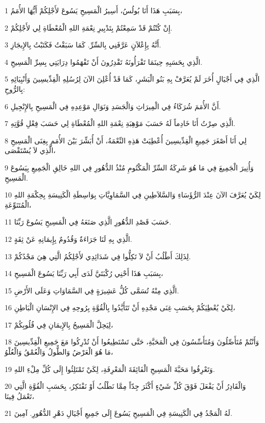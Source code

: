\par 1 بِسَبَبِ هَذَا أَنَا بُولُسُ، أَسِيرُ الْمَسِيحِ يَسُوعَ لأَجْلِكُمْ أَيُّهَا الأُمَمُ،
\par 2 إِنْ كُنْتُمْ قَدْ سَمِعْتُمْ بِتَدْبِيرِ نِعْمَةِ اللهِ الْمُعْطَاةِ لِي لأَجْلِكُمْ.
\par 3 أَنَّهُ بِإِعْلاَنٍ عَرَّفَنِي بِالسِّرِّ. كَمَا سَبَقْتُ فَكَتَبْتُ بِالإِيجَازِ.
\par 4 الَّذِي بِحَسَبِهِ حِينَمَا تَقْرَأُونَهُ تَقْدِرُونَ أَنْ تَفْهَمُوا دِرَايَتِي بِسِرِّ الْمَسِيحِ.
\par 5 الَّذِي فِي أَجْيَالٍ أُخَرَ لَمْ يُعَرَّفْ بِهِ بَنُو الْبَشَرِ، كَمَا قَدْ أُعْلِنَ الآنَ لِرُسُلِهِ الْقِدِّيسِينَ وَأَنْبِيَائِهِ بِالرُّوحِ:
\par 6 أَنَّ الأُمَمَ شُرَكَاءُ فِي الْمِيرَاثِ وَالْجَسَدِ وَنَوَالِ مَوْعِدِهِ فِي الْمَسِيحِ بِالإِنْجِيلِ.
\par 7 الَّذِي صِرْتُ أَنَا خَادِماً لَهُ حَسَبَ مَوْهِبَةِ نِعْمَةِ اللهِ الْمُعْطَاةِ لِي حَسَبَ فِعْلِ قُوَّتِهِ.
\par 8 لِي أَنَا أَصْغَرَ جَمِيعِ الْقِدِّيسِينَ أُعْطِيَتْ هَذِهِ النِّعْمَةُ، أَنْ أُبَشِّرَ بَيْنَ الأُمَمِ بِغِنَى الْمَسِيحِ الَّذِي لاَ يُسْتَقْصَى،
\par 9 وَأُنِيرَ الْجَمِيعَ فِي مَا هُوَ شَرِكَةُ السِّرِّ الْمَكْتُومِ مُنْذُ الدُّهُورِ فِي اللهِ خَالِقِ الْجَمِيعِ بِيَسُوعَ الْمَسِيحِ.
\par 10 لِكَيْ يُعَرَّفَ الآنَ عِنْدَ الرُّؤَسَاءِ وَالسَّلاَطِينِ فِي السَّمَاوِيَّاتِ بِوَاسِطَةِ الْكَنِيسَةِ بِحِكْمَةِ اللهِ الْمُتَنَوِّعَةِ،
\par 11 حَسَبَ قَصْدِ الدُّهُورِ الَّذِي صَنَعَهُ فِي الْمَسِيحِ يَسُوعَ رَبِّنَا.
\par 12 الَّذِي بِهِ لَنَا جَرَاءَةٌ وَقُدُومٌ بِإِيمَانِهِ عَنْ ثِقَةٍ.
\par 13 لِذَلِكَ أَطْلُبُ أَنْ لاَ تَكِلُّوا فِي شَدَائِدِي لأَجْلِكُمُ الَّتِي هِيَ مَجْدُكُمْ.
\par 14 بِسَبَبِ هَذَا أَحْنِي رُكْبَتَيَّ لَدَى أَبِي رَبِّنَا يَسُوعَ الْمَسِيحِ،
\par 15 الَّذِي مِنْهُ تُسَمَّى كُلُّ عَشِيرَةٍ فِي السَّمَاوَاتِ وَعَلَى الأَرْضِ.
\par 16 لِكَيْ يُعْطِيَكُمْ بِحَسَبِ غِنَى مَجْدِهِ أَنْ تَتَأَيَّدُوا بِالْقُوَّةِ بِرُوحِهِ فِي الإِنْسَانِ الْبَاطِنِ،
\par 17 لِيَحِلَّ الْمَسِيحُ بِالإِيمَانِ فِي قُلُوبِكُمْ،
\par 18 وَأَنْتُمْ مُتَأَصِّلُونَ وَمُتَأَسِّسُونَ فِي الْمَحَبَّةِ، حَتَّى تَسْتَطِيعُوا أَنْ تُدْرِكُوا مَعَ جَمِيعِ الْقِدِّيسِينَ مَا هُوَ الْعَرْضُ وَالطُّولُ وَالْعُمْقُ وَالْعُلْوُ،
\par 19 وَتَعْرِفُوا مَحَبَّةَ الْمَسِيحِ الْفَائِقَةَ الْمَعْرِفَةِ، لِكَيْ تَمْتَلِئُوا إِلَى كُلِّ مِلْءِ اللهِ.
\par 20 وَالْقَادِرُ أَنْ يَفْعَلَ فَوْقَ كُلِّ شَيْءٍ أَكْثَرَ جِدّاً مِمَّا نَطْلُبُ أَوْ نَفْتَكِرُ، بِحَسَبِ الْقُوَّةِ الَّتِي تَعْمَلُ فِينَا،
\par 21 لَهُ الْمَجْدُ فِي الْكَنِيسَةِ فِي الْمَسِيحِ يَسُوعَ إِلَى جَمِيعِ أَجْيَالِ دَهْرِ الدُّهُورِ. آمِينَ.

